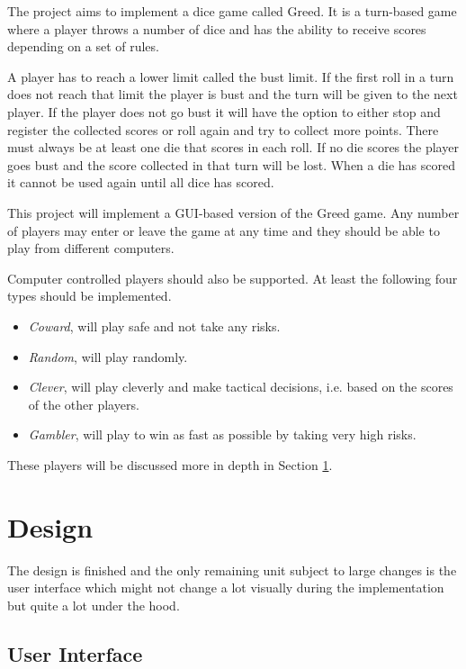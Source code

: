 \documentclass[10pt, titlepage, oneside, a4paper]{article}
\begin{document}
	The project aims to implement a dice game called Greed. It is a turn-based game where a player throws a number of dice and has the ability to receive scores depending on a set of rules.

	A player has to reach a lower limit called the bust limit. If the first roll in a turn does not reach that limit the player is bust and the turn will be given to the next player. If the player does not go bust it will have the option to either stop and register the collected scores or roll again and try to collect more points. There must always be at least one die that scores in each roll. If no die scores the player goes bust and the score collected in that turn will be lost. When a die has scored it cannot be used again until all dice has scored.

	This project will implement a GUI-based version of the Greed game. Any number of players may enter or leave the game at any time and they should be able to play from different computers.

	Computer controlled players should also be supported. At least the following four types should be implemented.

	\begin{itemize}
	\item \emph{Coward}, will play safe and not take any risks.
	\item \emph{Random}, will play randomly.
	\item \emph{Clever}, will play cleverly and make tactical decisions, i.e. based on the scores of the other players.
	\item \emph{Gambler}, will play to win as fast as possible by taking very high risks.
	\end{itemize}
	
	These players will be discussed more in depth in Section \ref{sec:design}.
	
	\section{Design}
	\label{sec:design}
	
	The design is finished and the only remaining unit subject to large changes is the user interface which might not change a lot visually during the implementation but quite a lot under the hood.
	
		\subsection{User Interface}
		
\end{document}
